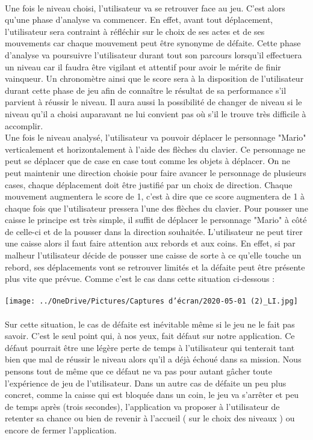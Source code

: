 \documentclass{article}
\begin{document}
\paragraph{}  Une fois le niveau choisi, l'utilisateur va se retrouver face au jeu. C'est alors qu'une phase d'analyse va commencer. En effet, avant tout déplacement, l'utilisateur sera contraint à réfléchir sur le choix de ses actes et de ses mouvements car chaque mouvement peut être synonyme de défaite. Cette phase d'analyse va poursuivre l'utilisateur durant tout son parcours lorsqu'il effectuera un niveau car il faudra être vigilant et attentif pour avoir le mérite de finir vainqueur. Un chronomètre ainsi que le score sera à la disposition de l'utilisateur durant cette phase de jeu afin de connaître le résultat de sa performance s'il parvient à réussir le niveau. Il aura aussi la possibilité de changer de niveau si le niveau qu'il a choisi auparavant ne lui convient pas où s'il le trouve très difficile à accomplir.
\\ 
Une fois le niveau analysé, l'utilisateur va pouvoir déplacer le personnage "Mario" verticalement et horizontalement à l'aide des flèches du clavier. Ce personnage ne peut se déplacer que de case en case tout comme les objets à déplacer. On ne peut maintenir une direction choisie pour faire avancer le personnage de plusieurs cases, chaque déplacement doit être justifié par un choix de direction. Chaque mouvement augmentera le score de 1, c'est à dire que ce score augmentera de 1 à chaque fois que l'utilisateur pressera l'une des flèches du clavier. Pour pousser une caisse le principe est très simple, il suffit de déplacer le personnage "Mario" à côté de celle-ci et de la pousser dans la direction souhaitée. L'utilisateur ne peut tirer une caisse alors il faut faire attention aux rebords et aux coins. En effet, si par malheur l'utilisateur décide de pousser une caisse de sorte à ce qu'elle touche un rebord, ses déplacements vont se retrouver limités et la défaite peut être présente plus vite que prévue. Comme c'est le cas dans cette situation ci-dessous : 
\\
\\
\texttt{[image: ../OneDrive/Pictures/Captures d’écran/2020-05-01 (2)\_LI.jpg]} 
\\
\\ 
Sur cette situation, le cas de défaite est inévitable même si le jeu ne le fait pas savoir. C'est le seul point qui, à nos yeux, fait défaut sur notre application. Ce défaut pourrait être une légère perte de temps à l'utilisateur qui tenterait tant bien que mal de réussir le niveau alors qu'il a déjà échoué dans sa mission. Nous pensons tout de même que ce défaut ne va pas pour autant gâcher toute l'expérience de jeu de l'utilisateur. Dans un autre cas de défaite un peu plus concret, comme la caisse qui est bloquée dans un coin, le jeu va s'arrêter et peu de temps après (trois secondes), l'application va proposer à l'utilisateur de retenter sa chance ou bien de revenir à l'accueil ( sur le choix des niveaux ) ou encore de fermer l'application.
\end{document}
